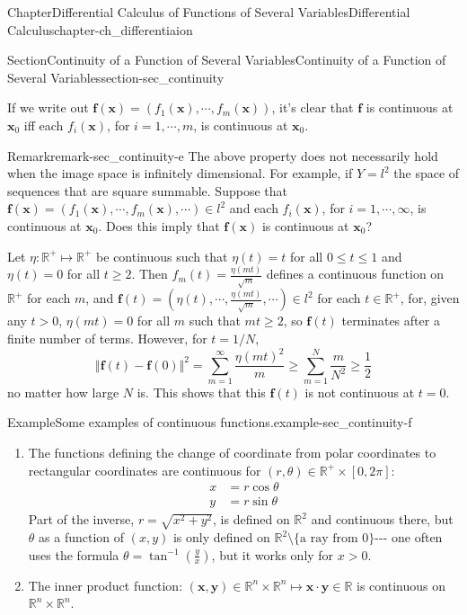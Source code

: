 \documentclass[oneside,10pt,]{book}
\numberwithin{equation}{section}
\newcommand{\bff}{\mathbf{f}}
\newcommand{\bx}{\mathbf{x}}
\newcommand{\by}{\mathbf{y}}
\newcommand{\bbR}{\mathbb{R}}
\newcommand{\gt}{>}
\newcommand{\amp}{&}
\begin{document}
\begin{chapterptx}{Chapter}{Differential Calculus of Functions of Several Variables}{}{Differential Calculus}{}{}{chapter-ch_differentiaion}
\begin{sectionptx}{Section}{Continuity of a Function of Several Variables}{}{Continuity of a Function of Several Variables}{}{}{section-sec_continuity}
\par
If we write out \(\bff(\bx)=(f_{1}(\bx),\cdots, f_{m}(\bx))\), it's clear that \(\bff\) is continuous at \(\bx_{0}\) iff each \(f_{i}(\bx)\), for \(i=1,\cdots, m\), is continuous at \(\bx_{0}\).%
\begin{remark}{Remark}{}{remark-sec_continuity-e}%
The above property does not necessarily hold when the image space is infinitely dimensional. For example, if \(Y=l^2\) the space of sequences that are square summable. Suppose that \(\bff(\bx)=(f_{1}(\bx),\cdots, f_{m}(\bx),\cdots)\in l^2\) and each \(f_{i}(\bx)\), for \(i=1,\cdots, \infty\), is continuous at \(\bx_{0}\). Does this imply that \(\bff(\bx)\) is continuous at \(\bx_{0}\)?%
\par
Let \(\eta:\bbR^+\mapsto \bbR^+\) be continuous such that \(\eta(t)=t\) for all \(0\le t\le 1\) and \(\eta(t)=0\) for all \(t\ge 2\). Then \(f_m(t)=\frac{\eta(m t)}{\sqrt m}\) defines a continuous function on \(\bbR^{+}\) for each \(m\), and \(\bff(t)=(\eta(t),\cdots, \frac{\eta(m t)}{\sqrt m},\cdots)\in l^2\) for each \(t\in \bbR^{+}\), for, given any  \(t\gt 0\), \(\eta(mt)=0\) for all \(m\) such that \(mt\ge 2\), so \(\bff(t)\) terminates after a finite number of terms. However, for \(t=1/N\),%
\begin{equation*}
\Vert \bff(t)-\bff(0)\Vert^2=\sum_{m=1}^{\infty} \frac{\eta(mt)^2}{m}\ge \sum_{m=1}^{N} \frac{m}{N^2}\ge \frac 12
\end{equation*}
no matter how large \(N\) is. This shows that this \(\bff(t)\) is not continuous at \(t=0\).%
\end{remark}
\begin{example}{Example}{Some examples of continuous functions.}{example-sec_continuity-f}%
\begin{enumerate}[font=\bfseries,label=(\alph*),ref=\alph*]
\item{}The functions defining the change of coordinate from  polar coordinates to rectangular coordinates are continuous for \((r, \theta) \in \bbR^+ \times [0, 2\pi]\):%
\begin{align*}
x \amp = r \cos \theta\\
y \amp =r \sin \theta
\end{align*}
Part of the inverse, \(r=\sqrt{x^2+y^2}\), is defined on \(\bbR^2\) and continuous there, but \(\theta\) as a function of \((x, y)\) is only defined on \(\bbR^2 \setminus\{\text{a ray from } 0\}\)-{}-{}- one often uses the formula \(\theta=\tan^{-1}(\frac yx)\), but it works only for \(x\gt 0\).%
\item{}The inner product function: \((\bx, \by)\in \bbR^n\times \bbR^n\mapsto \bx\cdot \by \in  \bbR\) is continuous on \(\bbR^n\times \bbR^n\).%

\end{enumerate}
\end{example}
\end{sectionptx}
\end{chapterptx}
\end{document}
